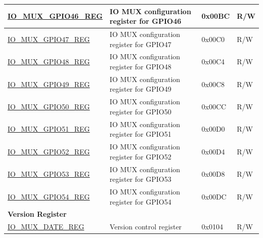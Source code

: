 \begin{longtable}{ | p{6cm} | p{7.2cm} | p{1.3cm} | p{1cm} | }
\hyperref[regdesc:IOMUXGPIONREG]{IO\_MUX\_GPIO46\_REG} & IO MUX configuration register for GPIO46 & 0x00BC & R/W \\ \hline
\hyperref[regdesc:IOMUXGPIONREG]{IO\_MUX\_GPIO47\_REG} & IO MUX configuration register for GPIO47 & 0x00C0 & R/W \\ \hline
\hyperref[regdesc:IOMUXGPIONREG]{IO\_MUX\_GPIO48\_REG} & IO MUX configuration register for GPIO48 & 0x00C4 & R/W \\ \hline
\hyperref[regdesc:IOMUXGPIONREG]{IO\_MUX\_GPIO49\_REG} & IO MUX configuration register for GPIO49 & 0x00C8 & R/W \\ \hline
\hyperref[regdesc:IOMUXGPIONREG]{IO\_MUX\_GPIO50\_REG} & IO MUX configuration register for GPIO50 & 0x00CC & R/W \\ \hline
\hyperref[regdesc:IOMUXGPIONREG]{IO\_MUX\_GPIO51\_REG} & IO MUX configuration register for GPIO51 & 0x00D0 & R/W \\ \hline
\hyperref[regdesc:IOMUXGPIONREG]{IO\_MUX\_GPIO52\_REG} & IO MUX configuration register for GPIO52 & 0x00D4 & R/W \\ \hline
\hyperref[regdesc:IOMUXGPIONREG]{IO\_MUX\_GPIO53\_REG} & IO MUX configuration register for GPIO53 & 0x00D8 & R/W \\ \hline
\hyperref[regdesc:IOMUXGPIONREG]{IO\_MUX\_GPIO54\_REG} & IO MUX configuration register for GPIO54 & 0x00DC & R/W \\ \hline
\multicolumn{4}{|l|}{\textbf{Version Register}} \\ \hline
\hyperref[regdesc:IOMUXDATEREG]{IO\_MUX\_DATE\_REG} & Version control register & 0x0104 & R/W \\ \hline
\end{longtable}
